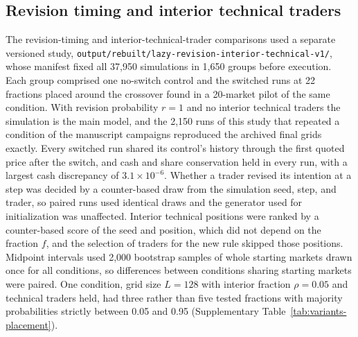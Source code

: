 \subsection{Revision timing and interior technical traders}
\label{app:variants}

The revision-timing and interior-technical-trader comparisons used a
separate versioned study, \texttt{output/rebuilt/lazy-revision-interior-technical-v1/},
whose manifest fixed all 37,950 simulations in 1,650 groups
before execution. Each group comprised one no-switch control and the
switched runs at 22 fractions placed around the crossover found in a
20-market pilot of the same condition. With revision probability $r=1$
and no interior technical traders the simulation is the main model, and the
2,150 runs of this study
that repeated a condition of the manuscript campaigns reproduced the
archived final grids exactly. Every switched run shared its control's
history through the first quoted price after the switch, and cash and
share conservation held in every run, with a largest cash discrepancy of
$3.1\times10^{-6}$. Whether a trader revised
its intention at a step was decided by a counter-based draw from the
simulation seed, step, and trader, so paired runs used identical draws and
the generator used for initialization was unaffected. Interior technical
positions were ranked by a counter-based score of the seed and position,
which did not depend on the fraction $f$, and the selection of traders for
the new rule skipped those positions. Midpoint intervals used 2,000
bootstrap samples of whole starting markets drawn once for all conditions,
so differences between conditions sharing starting markets were paired.
One condition, grid size $L=128$ with interior fraction $\rho=0.05$ and
technical traders held, had three rather than five tested fractions with
majority probabilities strictly between 0.05 and 0.95
(Supplementary Table~\ref{tab:variants-placement}).
